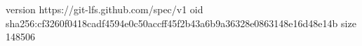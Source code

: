 version https://git-lfs.github.com/spec/v1
oid sha256:cf3260f0418cadf4594e0c50accff45f2b43a6b9a36328e0863148e16d48e14b
size 148506
